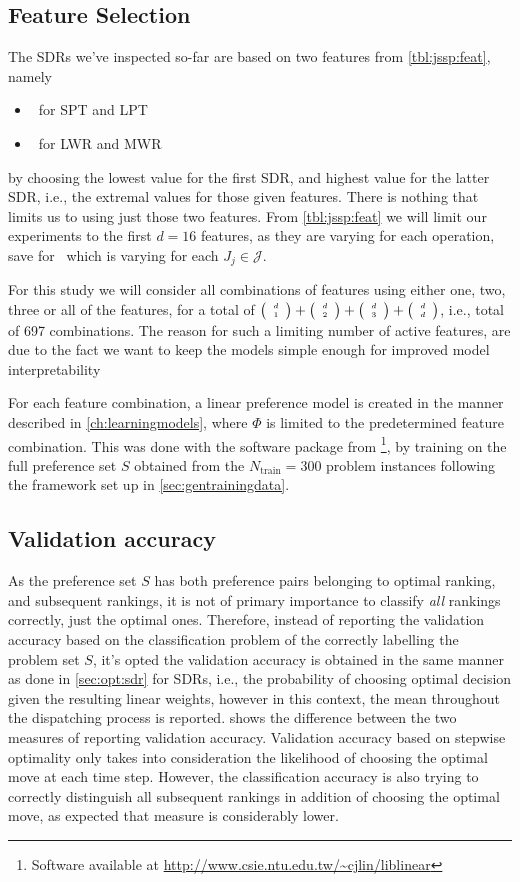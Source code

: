\documentclass[smallextended]{svjour3}
\begin{document}
\subsection{Feature Selection}
The SDRs we've inspected so-far are based on two features from
\cref{tbl:jssp:feat}, namely
\begin{itemize}
    \item \phiproc\ for SPT and LPT 
    \item \phiwrmJob\ for LWR and MWR 
\end{itemize}
by choosing the lowest value for the first SDR, and highest value for the 
latter SDR, i.e., the extremal values for those given features. 
There is nothing that limits us to using just those two features. 
From \cref{tbl:jssp:feat} we will limit our experiments to the first $d=16$ 
features, as they are varying for each operation, save for \phitotalProc\ which 
is varying for each $J_j\in\mathcal{J}$. 

For this study we will consider all combinations of features using either one,
two, three or all of the features, for a total of
$\tiny \left(\begin{array}{c}d\\1\end{array}\right)+\tiny \left(\begin{array}{c}d\\2\end{array}\right)+\tiny \left(\begin{array}{c}d\\3\end{array}\right)+\tiny \left(\begin{array}{c}d\\d\end{array}\right)$, i.e., total
of 697 combinations. The reason for such a limiting number of active features,
are due to the fact we want to keep the models simple enough for improved model
interpretability

For each feature combination, a linear preference model is created in the
manner described in \cref{ch:learningmodels}, where $\Phi$ is limited to the
predetermined feature combination. This was done with the software package from
\cite{liblinear}\footnote{Software available at 
    \url{http://www.csie.ntu.edu.tw/~cjlin/liblinear}},
by training on the full preference set $S$ obtained from the
$N_{\text{train}}=300$ problem instances following the framework set up in
\cref{sec:gentrainingdata}. 

\subsection{Validation accuracy}\label{sec:CDR:acc}
As the preference set $S$ has both preference pairs belonging to optimal
ranking, and subsequent rankings, it is not of primary importance to classify
\emph{all} rankings correctly, just the optimal ones. Therefore, instead of
reporting the validation accuracy based on the classification problem of the
correctly labelling the problem set $S$, it's opted the validation accuracy is
obtained in the same manner as done in \cref{sec:opt:sdr} for SDRs, i.e., the
probability of choosing optimal decision given the resulting linear weights,
however in this context, the mean throughout the dispatching process is
reported.  shows the difference between
the two measures of reporting validation accuracy. Validation accuracy based on
stepwise optimality only takes into consideration the likelihood of choosing
the optimal move at each time step. However, the classification accuracy is
also trying to correctly distinguish all subsequent rankings in addition of
choosing the optimal move, as expected that measure is considerably lower. 
\end{document}
